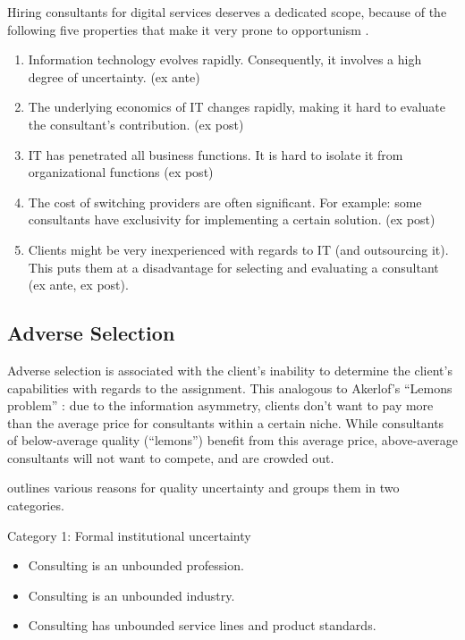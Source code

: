 \documentclass[12pt]{article}
\providecommand{\tightlist}{%
  \setlength{\itemsep}{0pt}\setlength{\parskip}{0pt}}
\begin{document}
Hiring consultants for digital services deserves a dedicated scope,
because of the following five properties that make it very prone to
opportunism \citep[ 207]{leslie1995}.

\begin{enumerate}
\def\labelenumi{\arabic{enumi}.}
\tightlist
\item
  Information technology evolves rapidly. Consequently, it involves a
  high degree of uncertainty. (ex ante)
\item
  The underlying economics of IT changes rapidly, making it hard to
  evaluate the consultant's contribution. (ex post)
\item
  IT has penetrated all business functions. It is hard to isolate it
  from organizational functions (ex post)
\item
  The cost of switching providers are often significant. For example:
  some consultants have exclusivity for implementing a certain solution.
  (ex post)
\item
  Clients might be very inexperienced with regards to IT (and
  outsourcing it). This puts them at a disadvantage for selecting and
  evaluating a consultant (ex ante, ex post).
\end{enumerate}

\hypertarget{adverse-selection}{%
\subsection{Adverse Selection}\label{adverse-selection}}

Adverse selection is associated with the client's inability to determine
the client's capabilities with regards to the assignment. This analogous
to Akerlof's ``Lemons problem'' \citeyearpar{akerlof1970}: due to the
information asymmetry, clients don't want to pay more than the average
price for consultants within a certain niche. While consultants of
below-average quality (``lemons'') benefit from this average price,
above-average consultants will not want to compete, and are crowded out.

\citep[ 69-75]{armbruster2006} outlines various reasons for quality
uncertainty and groups them in two categories.

Category 1: Formal institutional uncertainty

\begin{itemize}
\tightlist
\item
  Consulting is an unbounded profession.
\item
  Consulting is an unbounded industry.
\item
  Consulting has unbounded service lines and product standards.
\end{itemize}
\end{document}

